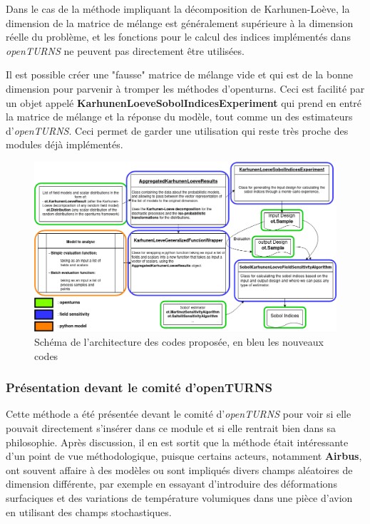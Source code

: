 \documentclass[a4paper,10pt]{article}
\begin{document}
\begin{itemize}
\begin{itemize}
    Dans le cas de la méthode impliquant la décomposition de Karhunen-Loève, la dimension de la matrice de mélange est généralement supérieure à la dimension réelle du problème, et les fonctions pour le calcul des indices implémentés dans \textit{openTURNS} ne peuvent pas directement être utilisées. \par \smallskip
    
    Il est possible créer une "fausse" matrice de mélange vide et qui est de la bonne dimension pour parvenir à tromper les méthodes d'openturns. Ceci est facilité par un objet appelé \textbf{KarhunenLoeveSobolIndicesExperiment} qui prend en entré la matrice de mélange et la réponse du modèle, tout comme un des estimateurs d'\textit{openTURNS}. Ceci permet de garder une utilisation qui reste très proche des modules déjà implémentés. 
   \end{itemize}
 
\end{itemize}


\begin{figure}[H]
   \centering   
   \hspace*{-1.5in}
   \noindent \includegraphics[scale=0.55]{DiagrammeExtensionOT.png}
      \caption{Schéma de l'architecture des codes proposée, en bleu les nouveaux codes}
         \label{SchemaArchitectureCodes}
\end{figure}


\subsubsection{Présentation devant le comité d'openTURNS}

Cette méthode a été présentée devant le comité d'\textit{openTURNS} pour voir si elle pouvait directement s'insérer dans ce module et si elle rentrait bien dans sa philosophie. Après discussion, il en est sortit que la méthode était intéressante d'un point de vue méthodologique, puisque certains acteurs, notamment \textbf{Airbus}, ont souvent affaire à des modèles ou sont impliqués divers champs aléatoires de dimension différente, par exemple en essayant d'introduire des déformations surfaciques et des variations de température volumiques dans une pièce d'avion en utilisant des champs stochastiques. \par \smallskip
\end{document}
